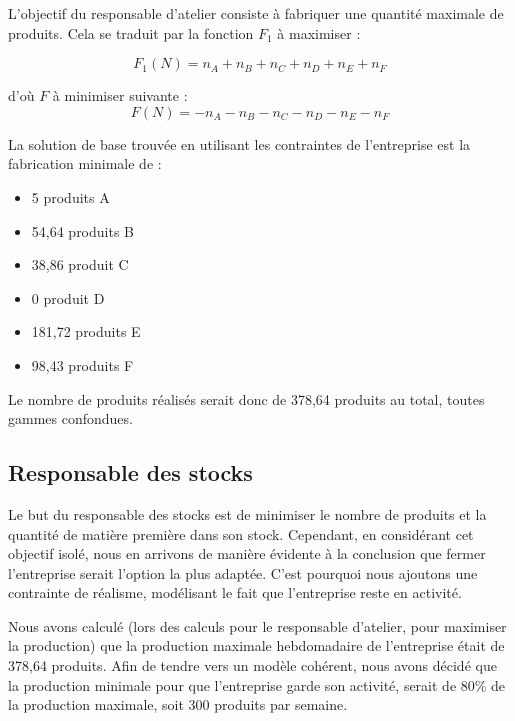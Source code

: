 \documentclass[a4paper,10pt]{article}
\begin{document}
L'objectif du responsable d'atelier consiste à fabriquer une quantité maximale de produits. Cela se traduit par la fonction $F_1$ à maximiser :

$$F_1(N) = n_A + n_B + n_C + n_D + n_E + n_F$$

d'où $F$ à minimiser suivante :
$$F(N) = - n_A - n_B - n_C - n_D - n_E - n_F$$

La solution de base trouvée en utilisant les contraintes de l'entreprise est la fabrication minimale de :\newline
\begin{itemize}
\item[\textbullet] 5 produits A
\item[\textbullet] 54,64 produits B
\item[\textbullet] 38,86 produit C
\item[\textbullet] 0 produit D
\item[\textbullet] 181,72 produits E
\item[\textbullet] 98,43 produits F\newline
\end{itemize}
Le nombre de produits réalisés serait donc de 378,64 produits au total, toutes gammes confondues.


\subsection{Responsable des stocks}

Le but du responsable des stocks est de minimiser le nombre de produits et la quantité de matière première dans son stock. Cependant, en considérant cet objectif isolé, nous en arrivons de manière évidente à la conclusion que fermer l'entreprise serait l'option la plus adaptée. C'est pourquoi nous ajoutons une contrainte de réalisme, modélisant le fait que l'entreprise reste en activité.\newline

Nous avons calculé (lors des calculs pour le responsable d'atelier, pour maximiser la production) que la production maximale hebdomadaire de l'entreprise était de 378,64 produits. Afin de tendre vers un modèle cohérent, nous avons décidé que la production minimale pour que l'entreprise garde son activité, serait de 80\% de la production maximale, soit 300 produits par semaine.\newline
\end{document}
